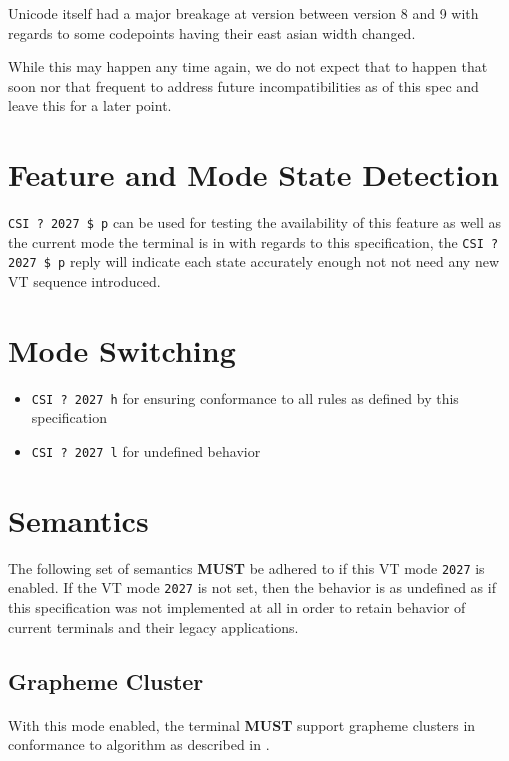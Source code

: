 \documentclass{article}
\newcommand{\code}[1]{\colorbox{light-gray}{\texttt{#1}}}
\newcommand{\DECRQM}[1]{\code{CSI ? #1 \$ p} }
\newcommand{\DECSET}[1]{\code{CSI ? #1 h} }
\newcommand{\DECRST}[1]{\code{CSI ? #1 l} }
\newcommand\VtModeNum{2027}                	%
\newcommand{\UCON}{\DECSET{\VtModeNum{}}}   %
\newcommand{\UCOFF}{\DECRST{\VtModeNum{}}}  %
\newcommand{\UCTEST}{\DECRQM{\VtModeNum{}}} %
\begin{document}
Unicode itself had a major breakage at version between version 8 and 9
with regards to some codepoints having their east asian width changed.

While this may happen any time again, we do not expect that to happen
that soon nor that frequent to address future incompatibilities
as of this spec and leave this for a later point.

\section{Feature and Mode State Detection}

\UCTEST \cite{DECRQM} can be used for testing the availability of this
feature as well as the current mode the terminal is in with regards
to this specification, the \UCTEST reply will indicate each state
accurately enough not not need any new VT sequence introduced.

\section{Mode Switching}

\begin{itemize}
	\item \UCON{} \cite{SM} for ensuring conformance to all rules as defined by this specification
	\item \UCOFF{} \cite{RM} for undefined behavior
\end{itemize}

\section{Semantics}

The following set of semantics \textbf{MUST} be adhered to if this
VT mode \code{\VtModeNum} is enabled.
If the VT mode \code{\VtModeNum} is not set, then the behavior is as undefined
as if this specification was not implemented at all in order to retain
behavior of current terminals and their legacy applications.

\subsection{Grapheme Cluster}

\paragraph*{}
With this mode enabled, the terminal \textbf{MUST} support grapheme clusters
in conformance to algorithm as described in \cite{UTS-29}.
\end{document}
